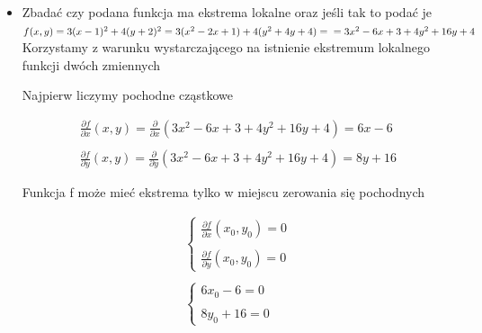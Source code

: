 \documentclass[12pt]{article}
\begin{document}
    \begin{itemize}
        \item Zbadać czy podana funkcja ma ekstrema lokalne oraz jeśli tak to podać je\\

        $f(x,y) = 3(x-1)^2 + 4(y+2)^2 = 3(x^2 - 2x +1) + 4(y^2 + 4y + 4) =\\ = 3x^2 - 6x + 3 + 4y^2 + 16y + 4$\\

        Korzystamy z warunku wystarczającego na istnienie ekstremum lokalnego funkcji dwóch zmiennych

        Najpierw liczymy pochodne cząstkowe

        \begin{equation}
            \begin{aligned}
                \frac{\partial f}{\partial x} (x,y) = \frac{\partial }{\partial x} \left( 3x^2 - 6x + 3 + 4y^2 + 16y + 4 \right) = 6x - 6 \\
                \\
                \frac{\partial f}{\partial y} (x,y) = \frac{\partial }{\partial y} \left( 3x^2 - 6x + 3 + 4y^2 + 16y + 4 \right) = 8y + 16
            \end{aligned}
        \end{equation}

        Funkcja f może mieć ekstrema tylko w miejscu zerowania się pochodnych

        \begin{equation}
            \begin{aligned}
                \left \{ \begin{array}{lr}
                             \frac{\partial f}{\partial x} (x_0, y_0 ) = 0 \\
                             \\
                             \frac{\partial f}{\partial y} (x_0, y_0) = 0
                \end{array} \right.
                \\
                \\
                \left \{ \begin{array}{lr}
                             6x_0 - 6 = 0 \\
                             \\
                             8y_0 + 16 = 0
                \end{array}\right.
            \end{aligned}
        \end{equation}


\end{itemize}
\end{document}
